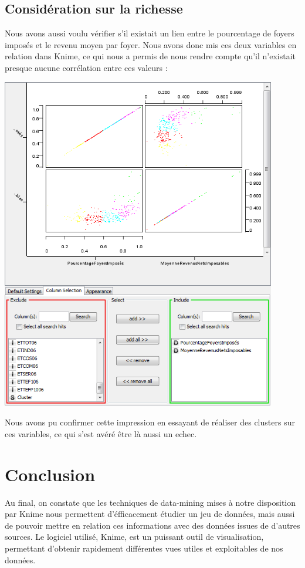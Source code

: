 \subsection{Considération sur la richesse}

Nous avons aussi voulu vérifier s'il existait un lien entre le pourcentage de foyers imposés et le revenu moyen par foyer. Nous avons donc mis ces deux variables en relation dans Knime, ce qui nous a permis de nous rendre compte qu'il n'existait presque aucune corrélation entre ces valeurs :

\begin{center}
	\includegraphics[width=0.9\textwidth]{png/pourcentage-foyers-imposable-vs-revenu.png}
\end{center}

Nous avons pu confirmer cette impression en essayant de réaliser des clusters sur ces variables, ce qui s'est avéré être là aussi un echec.


\section{Conclusion}

Au final, on constate que les techniques de data-mining mises à notre disposition par Knime nous permettent d'éfficacement étudier un jeu de données, mais aussi de pouvoir mettre en relation ces informations avec des données issues de d'autres sources. Le logiciel utilisé, Knime, est un puissant outil de visualisation, permettant d'obtenir rapidement différentes vues utiles et exploitables de nos données.
